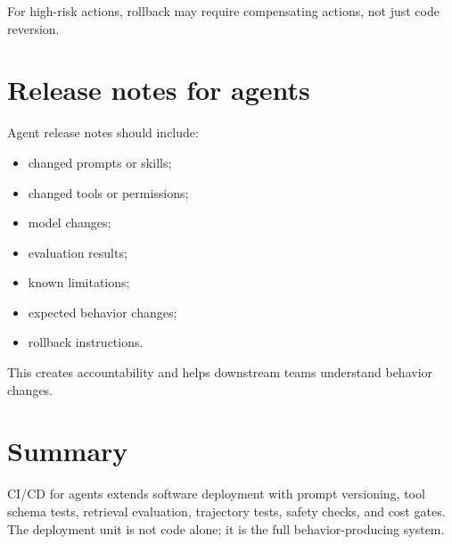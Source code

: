 For high-risk actions, rollback may require compensating actions, not just code reversion.

\section{Release notes for agents}

Agent release notes should include:

\begin{itemize}[leftmargin=*]
  \item changed prompts or skills;
  \item changed tools or permissions;
  \item model changes;
  \item evaluation results;
  \item known limitations;
  \item expected behavior changes;
  \item rollback instructions.
\end{itemize}

This creates accountability and helps downstream teams understand behavior changes.

\section{Summary}

CI/CD for agents extends software deployment with prompt versioning, tool schema tests, retrieval evaluation, trajectory tests, safety checks, and cost gates. The deployment unit is not code alone; it is the full behavior-producing system.
